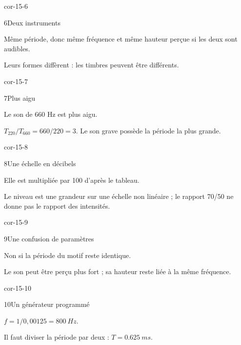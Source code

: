 \begin{blocLivre}{cor-15-6}\begin{corrige}{6}{Deux instruments}
\begin{questions}
\item Même période, donc même fréquence et même hauteur perçue si les deux sont audibles.
\item Leurs formes diffèrent : les timbres peuvent être différents.
\end{questions}
\end{corrige}\end{blocLivre}
\begin{blocLivre}{cor-15-7}\begin{corrige}{7}{Plus aigu}
\begin{questions}
\item Le son de 660 Hz est plus aigu.
\item $T_{220}/T_{660}=660/220=3$. Le son grave possède la période la plus grande.
\end{questions}
\end{corrige}\end{blocLivre}
\begin{blocLivre}{cor-15-8}\begin{corrige}{8}{Une échelle en décibels}
\begin{questions}
\item Elle est multipliée par 100 d’après le tableau.
\item Le niveau est une grandeur sur une échelle non linéaire ; le rapport 70/50 ne donne pas le rapport des intensités.
\end{questions}
\end{corrige}\end{blocLivre}
\clearpage
\begin{blocLivre}{cor-15-9}\begin{corrige}{9}{Une confusion de paramètres}
\begin{questions}
\item Non si la période du motif reste identique.
\item Le son peut être perçu plus fort ; sa hauteur reste liée à la même fréquence.
\end{questions}
\end{corrige}\end{blocLivre}
\begin{blocLivre}{cor-15-10}\begin{corrige}{10}{Un générateur programmé}
\begin{questions}
\item $f=1/0,00125=\qty{800}{Hz}$.
\item Il faut diviser la période par deux : $T=\qty{0,625}{ms}$.
\end{questions}
\end{corrige}\end{blocLivre}
